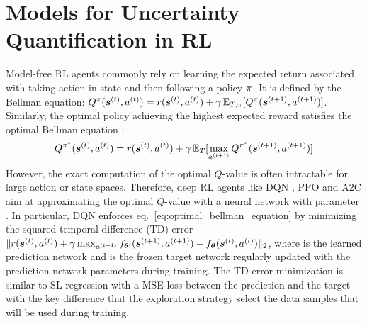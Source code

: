 \vspace{-3mm}
\section{Models for Uncertainty Quantification in RL}
\label{sec:model_011}

Model-free RL agents commonly rely on learning the expected return  associated with taking action  in state  and then following a policy $\operatorname{\pi}$. It is defined by the Bellman equation:
    $Q^{\operatorname{\pi}}(\bm{s}^{(t)}, a^{(t)}) = r(\bm{s}^{(t)}, a^{(t)}) + \gamma \operatorname{\mathbb{E}}_{T, \operatorname{\pi}} [Q^{\operatorname{\pi}}(\bm{s}^{(t+1)}, a^{(t+1)})]$.
Similarly, the optimal policy \smash{$\policy^*$} achieving the highest expected reward satisfies  the optimal Bellman equation \cite{dynamic-programming}:
\begin{equation}
\label{eq:optimal_bellman_equation}
    Q^{\operatorname{\pi}^*}(\bm{s}^{(t)}, a^{(t)}) = r(\bm{s}^{(t)}, a^{(t)}) + \gamma \operatorname{\mathbb{E}}_T [\max_{a^{(t+1)}} Q^{\operatorname{\pi}^*}(\bm{s}^{(t+1)}, a^{(t+1)})]
\end{equation}
However, the exact computation of the optimal $Q$-value is often intractable for large action or state spaces. Therefore, deep RL agents like DQN \cite{dqn}, PPO \cite{ppo} and A2C \cite{a2c} 
aim at approximating the optimal $Q$-value  with a neural network  with parameter \smash{$\bm{\theta}$}. In particular, DQN enforces eq.~\ref{eq:optimal_bellman_equation} by minimizing the squared temporal difference (TD) error $\|r(\bm{s}^{(t)}, a^{(t)}) + \gamma \max_{a^{(t+1)}} f_{\bm{\theta}'}(\bm{s}^{(t+1)}, a^{(t+1)}) - f_{\bm{\theta}}(\bm{s}^{(t)}, a^{(t)})\|_2$, where  is the learned prediction network and  is the frozen target network regularly updated with the prediction network parameters during training. The TD error minimization is similar to SL regression with a MSE loss between the prediction  and the target  with the key difference that the exploration strategy select the data samples that will be used during training.

